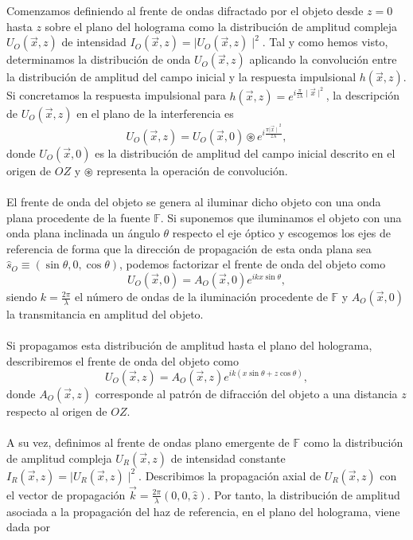 \documentclass[12pt]{article}
\begin{document}
Comenzamos definiendo al frente de ondas difractado por el objeto desde $z = 0$ hasta $z$ sobre el plano del holograma como  la distribución de amplitud compleja $U_O (\vec{x}, z)$ de intensidad  $I_O(\Vec{x}, z) = {\mid}U_O (\Vec{x}, z){\mid}^{2}$.  Tal y como hemos visto, determinamos la distribución de onda  $U_O (\vec{x}, z)$ aplicando la convolución entre  la distribución de amplitud del campo  inicial   y  la respuesta impulsional  $h (\Vec{x}, z)$. Si concretamos  la respuesta impulsional para $h (\Vec{x}, z)= e^{i \frac{\pi}{z \lambda} \mid \vec{x} \mid ^{2}}$, la descripción de  $U_O (\vec{x}, z)$  en el plano de la interferencia  es
\begin{equation}
    U_O (\vec{x}, z) =  U_O (\vec{x}, 0) \circledast e^{i \frac{\pi {\mid \vec{x} \mid}^{2}}{z \lambda}},
    \label{Ec.1}
\end{equation}
donde $U_O (\Vec{x}, 0)$ es la distribución  de amplitud del campo  inicial descrito en el origen de $OZ$ y $\circledast$ representa la operación de convolución.\\ \\
El frente de onda del objeto  se genera al iluminar dicho objeto con una onda plana procedente de la fuente $\mathbb{F}$. Si suponemos que iluminamos el objeto con una onda plana inclinada un ángulo $\theta$ respecto el eje óptico  y escogemos los ejes de referencia de forma que la dirección de propagación  de esta onda plana sea $\hat{s}_O \equiv (\sin{\theta}, 0, \cos{\theta})$, podemos factorizar el frente de onda del objeto como
\begin{equation}
    U_O (\vec{x}, 0) =  A_O (\vec{x}, 0) e^{i k x \sin{\theta}},
    \label{Ec.2}
\end{equation}
siendo $k = \frac{2 \pi}{\lambda}$ el número de ondas de la iluminación procedente de $\mathbb{F}$ y  $A_O (\vec{x}, 0)$ la transmitancia en amplitud del objeto.\\ \\
Si propagamos esta distribución de amplitud  hasta el plano del holograma, describiremos el frente de onda del objeto como
\begin{equation}
    U_O (\vec{x}, z) =  A_O (\vec{x}, z) e^{i k (x \sin{\theta} + z \cos{\theta})},
    \label{Ec.3}
\end{equation}
donde $A_O (\vec{x}, z)$ corresponde al patrón de difracción del objeto a una distancia $z$ respecto al origen de $OZ$.\\ \\
A su vez, definimos al  frente de ondas plano emergente de  $\mathbb{F}$ como la distribución de amplitud compleja $U_R (\vec{x}, z)$ de intensidad constante $I_R(\vec{x}, z) = {\mid}U_R (\Vec{x}, z){\mid}^{2}$. Describimos la propagación axial de $U_R (\vec{x}, z)$ con el vector de propagación $\Vec{k} = \frac{2 \pi}{\lambda} (0, 0, \hat{z})$. Por tanto, la distribución de amplitud asociada a la propagación del haz de referencia, en el plano del holograma, viene dada por
\end{document}
